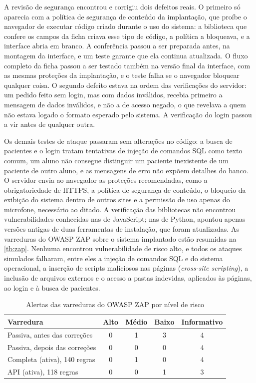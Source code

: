 A revisão de segurança encontrou e corrigiu dois defeitos reais. O primeiro só aparecia com a política de segurança de conteúdo da implantação, que proíbe o navegador de executar código criado durante o uso do sistema: a biblioteca que confere os campos da ficha criava esse tipo de código, a política a bloqueava, e a interface abria em branco. A conferência passou a ser preparada antes, na montagem da interface, e um teste garante que ela continua atualizada. O fluxo completo da ficha passou a ser testado também na versão final da interface, com as mesmas proteções da implantação, e o teste falha se o navegador bloquear qualquer coisa. O segundo defeito estava na ordem das verificações do servidor: um pedido feito sem login, mas com dados inválidos, recebia primeiro a mensagem de dados inválidos, e não a de acesso negado, o que revelava a quem não estava logado o formato esperado pelo sistema. A verificação do login passou a vir antes de qualquer outra.

Os demais testes de ataque passaram sem alterações no código: a busca de pacientes e o login tratam tentativas de injeção de comandos SQL como texto comum, um aluno não consegue distinguir um paciente inexistente de um paciente de outro aluno, e as mensagens de erro não expõem detalhes do banco. O servidor envia ao navegador as proteções recomendadas, como a obrigatoriedade de HTTPS, a política de segurança de conteúdo, o bloqueio da exibição do sistema dentro de outros sites e a permissão de uso apenas do microfone, necessário ao ditado. A verificação das bibliotecas não encontrou vulnerabilidades conhecidas nas de JavaScript; nas de Python, apontou apenas versões antigas de duas ferramentas de instalação, que foram atualizadas. As varreduras do OWASP ZAP sobre o sistema implantado estão resumidas na \autoref{tb:zap}. Nenhuma encontrou vulnerabilidade de risco alto, e todos os ataques simulados falharam, entre eles a injeção de comandos SQL e do sistema operacional, a inserção de scripts maliciosos nas páginas (\textit{cross-site scripting}), a inclusão de arquivos externos e o acesso a pastas indevidas, aplicados às páginas, ao login e à busca de pacientes.

\begin{table}[htbp]
	\caption{Alertas das varreduras do OWASP ZAP por nível de risco}
	\label{tb:zap}
	\footnotesize
	\centering
	\begin{tabular}{lcccc}
		\hline
		\textbf{Varredura} & \textbf{Alto} & \textbf{Médio} & \textbf{Baixo} & \textbf{Informativo} \\ \hline
		Passiva, antes das correções & 0 & 1 & 3 & 4 \\
		Passiva, depois das correções & 0 & 0 & 0 & 4 \\
		Completa (ativa), 140 regras & 0 & 1 & 0 & 4 \\
		API (ativa), 118 regras & 0 & 0 & 1 & 3 \\ \hline
	\end{tabular}
\end{table}

